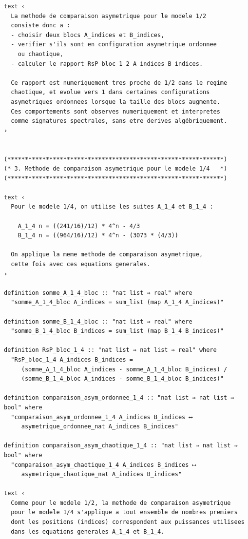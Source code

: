 \documentclass[a4paper,11pt]{article}
\begin{document}
\begin{holcode}[title={\textcolor{white}{File: methode\_spectral.thy -- Part 1/4}}]
\begin{lstlisting}
text ‹
  La methode de comparaison asymetrique pour le modele 1/2
  consiste donc a :
  - choisir deux blocs A_indices et B_indices,
  - verifier s'ils sont en configuration asymetrique ordonnee
    ou chaotique,
  - calculer le rapport RsP_bloc_1_2 A_indices B_indices.

  Ce rapport est numeriquement tres proche de 1/2 dans le regime
  chaotique, et evolue vers 1 dans certaines configurations
  asymetriques ordonnees lorsque la taille des blocs augmente.
  Ces comportements sont observes numeriquement et interpretes
  comme signatures spectrales, sans etre derives algébriquement.
›


(**************************************************************)
(* 3. Methode de comparaison asymetrique pour le modele 1/4   *)
(**************************************************************)

text ‹
  Pour le modele 1/4, on utilise les suites A_1_4 et B_1_4 :

    A_1_4 n = ((241/16)/12) * 4^n - 4/3
    B_1_4 n = ((964/16)/12) * 4^n - (3073 * (4/3))

  On applique la meme methode de comparaison asymetrique,
  cette fois avec ces equations generales.
›

definition somme_A_1_4_bloc :: "nat list ⇒ real" where
  "somme_A_1_4_bloc A_indices = sum_list (map A_1_4 A_indices)"

definition somme_B_1_4_bloc :: "nat list ⇒ real" where
  "somme_B_1_4_bloc B_indices = sum_list (map B_1_4 B_indices)"

definition RsP_bloc_1_4 :: "nat list ⇒ nat list ⇒ real" where
  "RsP_bloc_1_4 A_indices B_indices =
     (somme_A_1_4_bloc A_indices - somme_A_1_4_bloc B_indices) /
     (somme_B_1_4_bloc A_indices - somme_B_1_4_bloc B_indices)"

definition comparaison_asym_ordonnee_1_4 :: "nat list ⇒ nat list ⇒ bool" where
  "comparaison_asym_ordonnee_1_4 A_indices B_indices ⟷
     asymetrique_ordonnee_nat A_indices B_indices"

definition comparaison_asym_chaotique_1_4 :: "nat list ⇒ nat list ⇒ bool" where
  "comparaison_asym_chaotique_1_4 A_indices B_indices ⟷
     asymetrique_chaotique_nat A_indices B_indices"

text ‹
  Comme pour le modele 1/2, la methode de comparaison asymetrique
  pour le modele 1/4 s'applique a tout ensemble de nombres premiers
  dont les positions (indices) correspondent aux puissances utilisees
  dans les equations generales A_1_4 et B_1_4.


\end{lstlisting}
\end{holcode}
\end{document}
